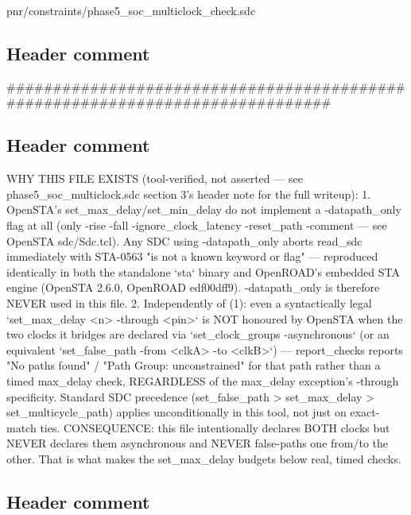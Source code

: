 \begin{relocated}{pnr/constraints/phase5_soc_multiclock_check.sdc}

\subsection*{Header comment}

\begin{textblock}
##############################################################################
\end{textblock}

\subsection*{Header comment}

\begin{textblock}

WHY THIS FILE EXISTS (tool-verified, not asserted — see
phase5_soc_multiclock.sdc section 3's header note for the full writeup):
  1. OpenSTA's set_max_delay/set_min_delay do not implement a
     -datapath_only flag at all (only -rise -fall -ignore_clock_latency
     -reset_path -comment — see OpenSTA sdc/Sdc.tcl). Any SDC using
     -datapath_only aborts read_sdc immediately with STA-0563 "is not a
     known keyword or flag" — reproduced identically in both the
     standalone `sta` binary and OpenROAD's embedded STA engine
     (OpenSTA 2.6.0, OpenROAD edf00dff9). -datapath_only is therefore
     NEVER used in this file.
  2. Independently of (1): even a syntactically legal
     `set_max_delay <n> -through <pin>` is NOT honoured by OpenSTA when
     the two clocks it bridges are declared via
     `set_clock_groups -asynchronous` (or an equivalent
     `set_false_path -from <clkA> -to <clkB>`) — report_checks reports
     "No paths found" / "Path Group: unconstrained" for that path rather
     than a timed max_delay check, REGARDLESS of the max_delay
     exception's -through specificity. Standard SDC precedence
     (set_false_path > set_max_delay > set_multicycle_path) applies
     unconditionally in this tool, not just on exact-match ties.
CONSEQUENCE: this file intentionally declares BOTH clocks but NEVER
declares them asynchronous and NEVER false-paths one from/to the other.
That is what makes the set_max_delay budgets below real, timed checks.

\end{textblock}

\subsection*{Header comment}


\end{relocated}
